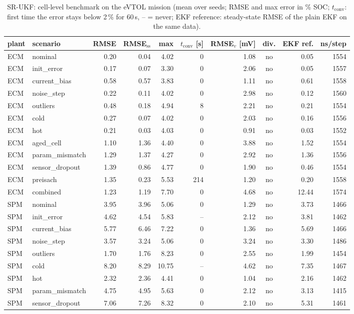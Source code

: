 \begin{table}[H]\centering\footnotesize\setlength{\tabcolsep}{4pt}
\caption{SR-UKF: cell-level benchmark on the eVTOL mission (mean over seeds; RMSE and max error in \% SOC; $t_\mathrm{conv}$: first time the error stays below 2\,\% for 60\,s, -- = never; EKF reference: steady-state RMSE of the plain EKF on the same data).}\label{tab:cell_SRUKF}
\begin{tabular}{llrrrrrcrr}\toprule
plant & scenario & RMSE & RMSE$_\mathrm{ss}$ & max & $t_\mathrm{conv}$ [s] & RMSE$_v$ [mV] & div. & EKF ref. & ns/step \\ \midrule
ECM & nominal & 0.20 & 0.04 & 4.02 & 0 & 1.08 & no & 0.05 & 1554 \\
ECM & init\_error & 0.17 & 0.07 & 3.30 & 0 & 2.06 & no & 0.05 & 1557 \\
ECM & current\_bias & 0.58 & 0.57 & 3.83 & 0 & 1.11 & no & 0.61 & 1558 \\
ECM & noise\_step & 0.22 & 0.11 & 4.02 & 0 & 2.98 & no & 0.12 & 1560 \\
ECM & outliers & 0.48 & 0.18 & 4.94 & 8 & 2.21 & no & 0.21 & 1554 \\
ECM & cold & 0.27 & 0.07 & 4.02 & 0 & 2.03 & no & 0.16 & 1556 \\
ECM & hot & 0.21 & 0.03 & 4.03 & 0 & 0.91 & no & 0.03 & 1552 \\
ECM & aged\_cell & 1.10 & 1.36 & 4.40 & 0 & 3.88 & no & 1.52 & 1554 \\
ECM & param\_mismatch & 1.29 & 1.37 & 4.27 & 0 & 2.92 & no & 1.36 & 1556 \\
ECM & sensor\_dropout & 1.39 & 0.86 & 4.77 & 0 & 1.90 & no & 0.46 & 1554 \\
ECM & preisach & 1.35 & 0.23 & 5.53 & 214 & 1.20 & no & 0.20 & 1558 \\
ECM & combined & 1.23 & 1.19 & 7.70 & 0 & 4.68 & no & 12.44 & 1574 \\
\midrule
SPM & nominal & 3.95 & 3.96 & 5.06 & 0 & 1.29 & no & 3.73 & 1466 \\
SPM & init\_error & 4.62 & 4.54 & 5.83 & -- & 2.12 & no & 3.81 & 1462 \\
SPM & current\_bias & 5.77 & 6.46 & 7.22 & 0 & 1.36 & no & 5.69 & 1466 \\
SPM & noise\_step & 3.57 & 3.24 & 5.06 & 0 & 3.24 & no & 3.30 & 1486 \\
SPM & outliers & 1.70 & 1.76 & 8.23 & 0 & 2.55 & no & 1.99 & 1454 \\
SPM & cold & 8.20 & 8.29 & 10.75 & -- & 4.62 & no & 7.35 & 1467 \\
SPM & hot & 2.32 & 2.36 & 4.41 & 0 & 1.04 & no & 2.16 & 1462 \\
SPM & param\_mismatch & 4.75 & 4.95 & 5.63 & 0 & 2.12 & no & 3.13 & 1415 \\
SPM & sensor\_dropout & 7.06 & 7.26 & 8.32 & 0 & 2.10 & no & 5.31 & 1461 \\
\bottomrule\end{tabular}\end{table}
